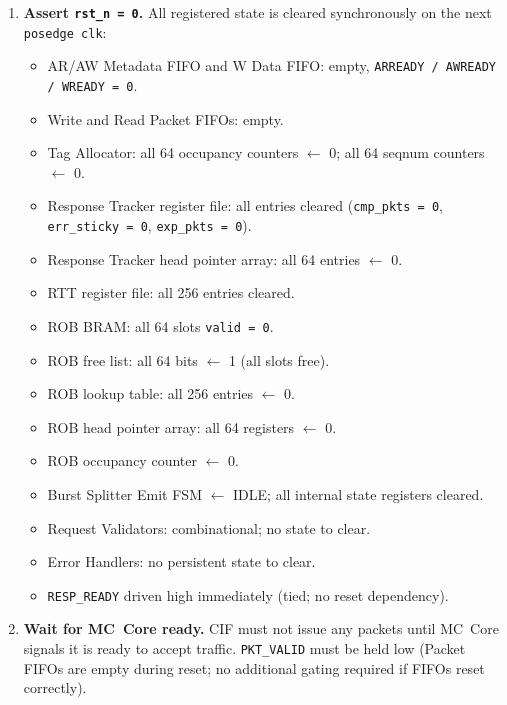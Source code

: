 \documentclass[11pt,a4paper]{article}
\begin{document}
\begin{enumerate}
  \item \textbf{Assert \texttt{rst\_n = 0}.}
        All registered state is cleared synchronously on the next
        \texttt{posedge clk}:
        \begin{itemize}
          \item AR/AW Metadata FIFO and W Data FIFO: empty, \texttt{ARREADY / AWREADY / WREADY = 0}.
          \item Write and Read Packet FIFOs: empty.
          \item Tag Allocator: all 64 occupancy counters $\leftarrow$ 0; all 64 seqnum counters $\leftarrow$ 0.
          \item Response Tracker register file: all entries cleared (\texttt{cmp\_pkts = 0}, \texttt{err\_sticky = 0}, \texttt{exp\_pkts = 0}).
          \item Response Tracker head pointer array: all 64 entries $\leftarrow$ 0.
          \item RTT register file: all 256 entries cleared.
          \item ROB BRAM: all 64 slots \texttt{valid = 0}.
          \item ROB free list: all 64 bits $\leftarrow$ 1 (all slots free).
          \item ROB lookup table: all 256 entries $\leftarrow$ 0.
          \item ROB head pointer array: all 64 registers $\leftarrow$ 0.
          \item ROB occupancy counter $\leftarrow$ 0.
          \item Burst Splitter Emit FSM $\leftarrow$ \textsc{IDLE}; all internal state registers cleared.
          \item Request Validators: combinational; no state to clear.
          \item Error Handlers: no persistent state to clear.
          \item \texttt{RESP\_READY} driven high immediately (tied; no reset dependency).
        \end{itemize}

  \item \textbf{Wait for MC~Core ready.}
        CIF must not issue any packets until MC~Core signals it is ready to
        accept traffic. \texttt{PKT\_VALID} must be held low (Packet FIFOs are
        empty during reset; no additional gating required if FIFOs reset
        correctly).


\end{enumerate}
\end{document}
